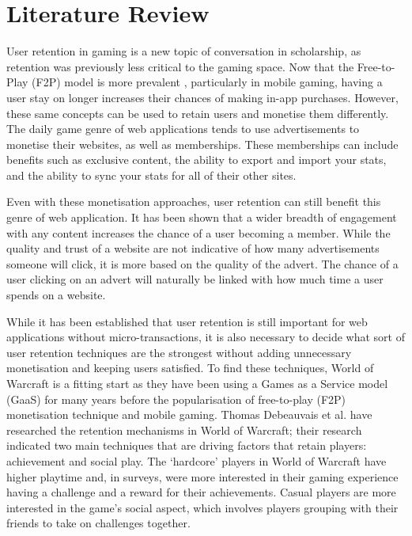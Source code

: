 
\chapter{Literature Review}
User retention in gaming is a new topic of conversation in scholarship,\cite{Tseng2015} as retention was previously less critical to the gaming space.\cite{Petrovskaya2022} Now that the Free-to-Play (F2P) model is more prevalent \cite{Koskenvoima2015}, particularly in mobile gaming,\cite{Skorin-Kapov2022} having a user stay on longer increases their chances of making in-app purchases.\cite{Jang2021} However, these same concepts can be used to retain users and monetise them differently.\cite{Jung2022} The daily game genre of web applications tends to use advertisements to monetise their websites,\cite{Framed} as well as memberships. These memberships can include benefits such as exclusive content, the ability to export and import your stats, and the ability to sync your stats for all of their other sites.\cite{Ko-fi}

Even with these monetisation approaches, user retention can still benefit this genre of web application.\cite{Ross2018} It has been shown that a wider breadth of engagement with any content increases the chance of a user becoming a member.\cite{Yang2022} While the quality and trust of a website are not indicative of how many advertisements someone will click, it is more based on the quality of the advert. The chance of a user clicking on an advert will naturally be linked with how much time a user spends on a website.\cite{Werner2022}

While it has been established that user retention is still important for web applications without micro-transactions, it is also necessary to decide what sort of user retention techniques are the strongest without adding unnecessary monetisation and keeping users satisfied.\cite{Ross2018} To find these techniques, World of Warcraft is a fitting start as they have been using a Games as a Service model (GaaS) for many years before the popularisation of free-to-play (F2P) monetisation technique and mobile gaming. Thomas Debeauvais et al. have researched the retention mechanisms in World of Warcraft; their research indicated two main techniques that are driving factors that retain players: achievement and social play.\cite{Debeauvais2010} The ‘hardcore’ players in World of Warcraft have higher playtime and, in surveys, were more interested in their gaming experience having a challenge and a reward for their achievements. Casual players are more interested in the game's social aspect, which involves players grouping with their friends to take on challenges together.\cite{Debeauvais2010}

